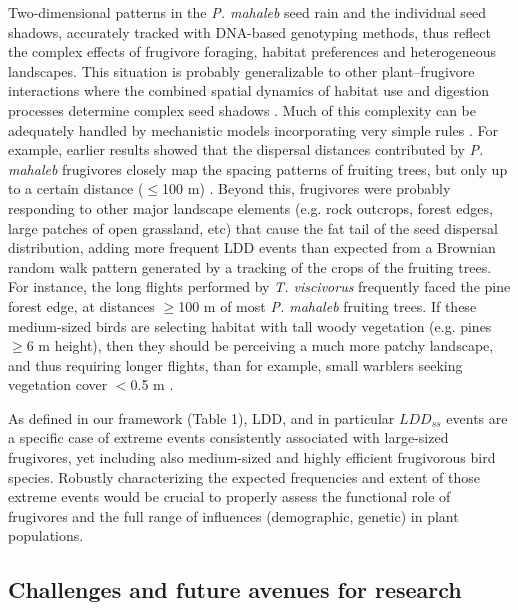 \documentclass[a4paper, 12pt]{article}
\begin{document}
\begin{linenumbers}
Two-dimensional patterns in the \textit{P. mahaleb} seed rain and the individual seed shadows, accurately tracked with DNA-based genotyping methods, thus reflect the complex effects of frugivore foraging, habitat preferences and heterogeneous landscapes. This situation is probably generalizable to other plant--frugivore interactions where the combined spatial dynamics of habitat use and digestion processes determine complex seed shadows \citep{Westcott:200,Jordano:2007,Nathan:2008is}. Much of this complexity can be adequately handled by mechanistic models \citep{Nathan:2002a} incorporating very simple rules \citep{Guttal:2011hs}. For example, earlier results \citep{Jordano:2007a} showed that the dispersal distances contributed by \textit{P. mahaleb} frugivores closely map the spacing patterns of fruiting trees, but only up to a certain distance ($\leq$100 m) \citep[Fig. 10.3a in][]{Jordano:2007a}. Beyond this, frugivores were probably responding to other major landscape elements (e.g. rock outcrops, forest edges, large patches of open grassland, etc) that cause the fat tail of the seed dispersal distribution, adding more frequent LDD events than expected from a Brownian random walk pattern generated by a tracking of the crops of the fruiting trees. For instance, the long flights performed by \textit{T. viscivorus} \citep{Jordano:2000ft} frequently faced the pine forest edge, at distances $\geq$100 m of most \textit{P. mahaleb} fruiting trees. If these medium-sized birds are selecting habitat with tall woody vegetation (e.g. pines $\geq$6 m height), then they should be perceiving a much more patchy landscape, and thus requiring longer flights, than for example, small warblers seeking vegetation cover $<$0.5 m \citep[Fig. 10.3b in][]{Jordano:2007a}.

As defined in our framework (Table 1), LDD, and in particular $LDD_{ss}$ events are a specific case of extreme events \citep{Garcia:2017aa} consistently associated with large-sized frugivores, yet including also medium-sized and highly efficient frugivorous bird species. Robustly characterizing the expected frequencies and extent of those extreme events would be crucial to properly assess the functional role of frugivores and the full range of influences (demographic, genetic) in plant populations.


\subsection*{Challenges and future avenues for research}


\end{linenumbers}
\end{document}
